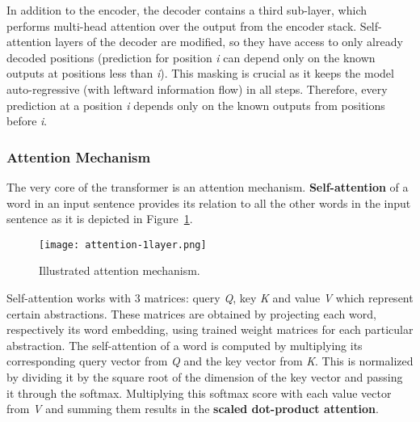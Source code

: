     In addition to the encoder, the decoder contains a third sub-layer, which performs multi-head attention over the output from the encoder stack. Self-attention layers of the decoder are modified, so they have access to only already decoded positions (prediction for position \emph{i} can depend only on the known outputs at positions less than \emph{i}). This masking is crucial as it keeps the model auto-regressive (with leftward information flow) in all steps. Therefore, every prediction at a position \emph{i} depends only on the known outputs from positions before \emph{i}.
    


\subsubsection{Attention Mechanism}
\label{section:attention-mechanism}
    The very core of the transformer is an attention mechanism. 
    \textbf{Self-attention} of a word in an input sentence provides its relation to all the other words in the input sentence as it is depicted in Figure~\ref{fig:attention-sentence}.
    \begin{figure}[H]
        \texttt{[image: attention-1layer.png]}
        \centering
        \caption[Illustrated attention mechanism]{Illustrated attention mechanism.~\parencite{alammar_transformer}}
        \label{fig:attention-sentence}
    \end{figure}
    
    Self-attention works with 3 matrices: query \emph{Q}, key \emph{K} and value \emph{V} which represent certain abstractions. These matrices are obtained by projecting each word, respectively its word embedding, using trained weight matrices for each particular abstraction. The self-attention of a word is computed by multiplying its corresponding query vector from \emph{Q} and the key vector from \emph{K}. This is normalized by dividing it by the square root of the dimension of the key vector and passing it through the softmax. Multiplying this softmax score with each value vector from \emph{V} and summing them results in the \textbf{scaled dot-product attention}.
    
